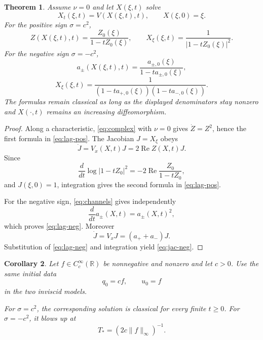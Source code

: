 \documentclass[11pt]{article}
\newtheorem{theorem}{Theorem}[section]
\newtheorem{corollary}[theorem]{Corollary}
\theoremstyle{definition}
\newcommand{\R}{\mathbb R}
\begin{document}
\begin{theorem}\label{thm:lagrangian}
Assume $\nu=0$ and let $X(\xi,t)$ solve
\[
 X_t(\xi,t)=V(X(\xi,t),t),
 \qquad X(\xi,0)=\xi.
\]
For the positive sign $\sigma=c^2$,
\begin{equation}\label{eq:lag-pos}
 Z(X(\xi,t),t)=\frac{Z_0(\xi)}{1-tZ_0(\xi)},
 \qquad
 X_\xi(\xi,t)=\frac{1}{|1-tZ_0(\xi)|^2}.
\end{equation}
For the negative sign $\sigma=-c^2$,
\begin{equation}\label{eq:lag-neg}
 a_\pm(X(\xi,t),t)=\frac{a_{\pm,0}(\xi)}{1-ta_{\pm,0}(\xi)},
\end{equation}
\begin{equation}\label{eq:jac-neg}
 X_\xi(\xi,t)
 =\frac{1}{(1-ta_{+,0}(\xi))(1-ta_{-,0}(\xi))}.
\end{equation}
The formulas remain classical as long as the displayed denominators stay nonzero and $X(\cdot,t)$ remains an increasing diffeomorphism.
\end{theorem}

\begin{proof}
Along a characteristic, \eqref{eq:complex} with $\nu=0$ gives $\dot Z=Z^2$, hence the first formula in \eqref{eq:lag-pos}.  The Jacobian $J=X_\xi$ obeys
\[
 \dot J=V_x(X,t)J=2\operatorname{Re}Z(X,t)J.
\]
Since
\[
 \frac{d}{dt}\log|1-tZ_0|^2
 =-2\operatorname{Re}\frac{Z_0}{1-tZ_0},
\]
and $J(\xi,0)=1$, integration gives the second formula in \eqref{eq:lag-pos}.

For the negative sign, \eqref{eq:channels} gives independently
\[
 \frac{d}{dt}a_\pm(X,t)=a_\pm(X,t)^2,
\]
which proves \eqref{eq:lag-neg}.  Moreover
\[
 \dot J=V_xJ=(a_++a_-)J.
\]
Substitution of \eqref{eq:lag-neg} and integration yield \eqref{eq:jac-neg}.
\end{proof}

\begin{corollary}\label{cor:samedata}
Let $f\in C_c^\infty(\R)$ be nonnegative and nonzero and let $c>0$.  Use the same initial data
\begin{equation}\label{eq:samedata}
 q_0=cf,
 \qquad u_0=f
\end{equation}
in the two inviscid models.

For $\sigma=c^2$, the corresponding solution is classical for every finite $t\ge0$.  For $\sigma=-c^2$, it blows up at
\begin{equation}\label{eq:samedataT}
 T_*=(2c\|f\|_\infty)^{-1}.
\end{equation}
\end{corollary}
\end{document}
